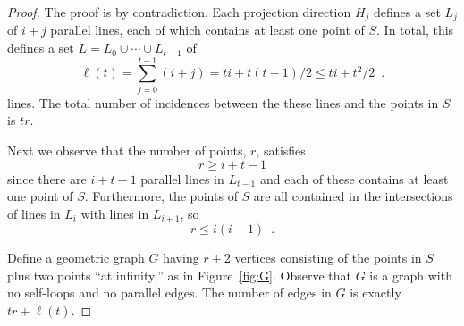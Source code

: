 \documentclass[12pt]{article}
\begin{document}
\begin{proof}
The proof is by contradiction. Each projection direction $H_j$ defines a set $L_j$ of $i+j$ parallel lines,
each of which contains at least one point of $S$.  In total, this defines
a set $L=L_0\cup\cdots\cup L_{t-1}$ of
\[
   \ell(t) = \sum_{j=0}^{t-1} (i+j) = ti + t(t-1)/2 \le ti + t^2/2 \enspace .
\]
lines.  The total number of incidences between the these lines and
the points in $S$ is $tr$.

Next we observe that the number of points, $r$, satisfies
\[  r \ge i+t-1 
\]
since there are $i+t-1$ parallel lines in $L_{t-1}$ and each of these
contains at least one point of $S$.  Furthermore, the points of $S$
are all contained in the intersections of lines in $L_{i}$ with lines
in $L_{i+1}$, so
\[
   r \le i(i+1) \enspace .
\]

Define a geometric graph $G$ having $r+2$ vertices consisting
of the points in $S$ plus two points ``at infinity,'' as in
Figure~\ref{fig:G}. Observe that $G$ is a graph with no self-loops and no
parallel edges. The number of
edges in $G$ is exactly $tr + \ell(t)$.


\end{proof}
\end{document}
